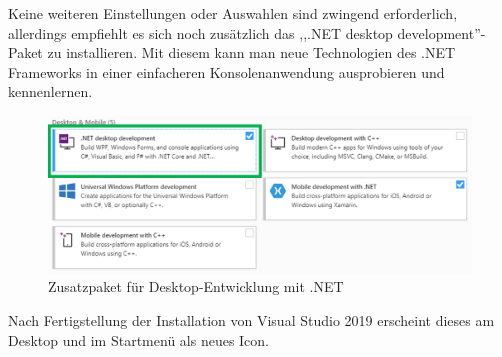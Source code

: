 Keine weiteren Einstellungen oder Auswahlen sind zwingend erforderlich, allerdings empfiehlt es sich noch zusätzlich das ,,.NET desktop development''-Paket zu installieren.
Mit diesem kann man neue Technologien des .NET Frameworks in einer einfacheren Konsolenanwendung ausprobieren und kennenlernen.
\begin{figure}[H]
    \centering\includegraphics[width=0.9\linewidth]{images/auswahl_rahmenwerk/installation2.png}    
    \caption{Zusatzpaket für Desktop-Entwicklung mit .NET}
\end{figure}
Nach Fertigstellung der Installation von Visual Studio 2019 erscheint dieses am Desktop und im Startmenü als neues Icon.

